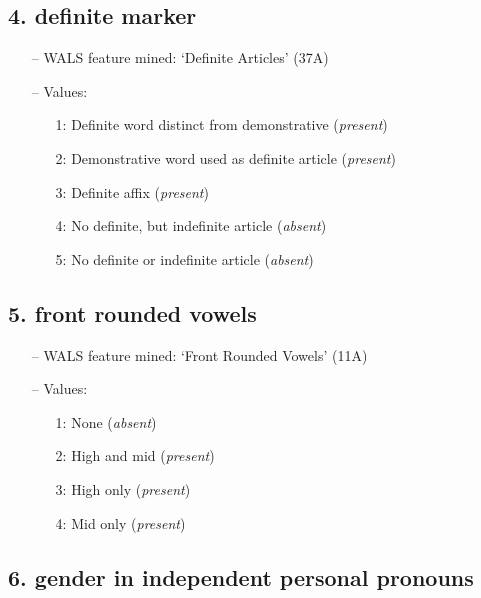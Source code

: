 \subsection*{4. definite marker}

\begin{itemize}
\item[--] WALS feature mined: `Definite Articles' (37A)
\item[--] Values:

\begin{enumerate}
\item[1:] Definite word distinct from demonstrative (\emph{present})
\item[2:] Demonstrative word used as definite article (\emph{present})
\item[3:] Definite affix (\emph{present})
\item[4:] No definite, but indefinite article (\emph{absent})
\item[5:] No definite or indefinite article (\emph{absent})
\end{enumerate}
\end{itemize}

\subsection*{5. front rounded vowels}

\begin{itemize}
\item[--] WALS feature mined: `Front Rounded Vowels' (11A)
\item[--] Values:

\begin{enumerate}
\item[1:] None (\emph{absent})
\item[2:] High and mid (\emph{present})
\item[3:] High only (\emph{present})
\item[4:] Mid only (\emph{present})
\end{enumerate}
\end{itemize}

\subsection*{6. gender in independent personal pronouns}

